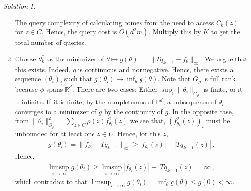 \documentclass{article}
\newcommand{\norm}[1]{\| #1 \|}
\newcommand{\R}{\mathbb{R}}
\DeclareMathOperator*{\1}{\mathbbm{1}}
\newcommand{\0}{\mathbf{0}}
\theoremstyle{definition}
\theoremstyle{remark}
\newtheorem*{solution*}{Solution}
\theoremstyle{theorem}
\newcommand{\cS}{\mathcal{S}}
\newcommand{\cA}{\mathcal{A}}
\begin{document}
\begin{solution*}
\begin{enumerate}
The query complexity of calculating comes from the need to access $C_k(z)$ for $z\in C$. Hence, the query cost is $O(d^2 m)$.
Multiply this by $K$ to get the total number of queries. 
\item Choose $\theta_k^*$ 
as the minimizer of $\theta \mapsto g(\theta):=\norm{ T q_{k-1} -  f_\theta }_\infty$. 
We argue that this exists. 
Indeed, $g$ is continuous and nonnegative. Hence, there exists a sequence $(\theta_i)_i$ such that $g(\theta_i)\to \inf_\theta g(\theta)$.
Note that $G_\rho$ is full rank because $\phi$ spans $\R^d$.
There are two cases: Either $\sup_i \norm{\theta_i}_{G_\rho}$ is finite, or it is infinite.
If it is finite, by the completeness of $\R^d$, a subsequence of $\theta_i$ converges to a minimizer of $g$
by the continuity of $g$.
In the opposite case, from $\norm{\theta_i}_{G_\rho}^2 = \sum_{z\in C} \rho(z) f_{\theta_i}^2(z)$ we see that, $(f_{\theta_i}^2(z))_i$ must be unbounded for at least one $z\in C$. 
Hence, for this $z$,
\begin{align*}
g(\theta_i)=\norm{f_{\theta_i} - T q_{k-1} }_\infty \ge |f_{\theta_i}(z)|-|T q_{k-1}(z)| \,.
\end{align*}
Hence,
\begin{align*}
\limsup_{i\to\infty} g(\theta_i) \ge \limsup_{i\to\infty} |f_{\theta_i}(z)|-|T q_{k-1}(z)|  = \infty\,,
\end{align*}
which contradict to that $\limsup_{i\to\infty} g(\theta_i) = \inf_{\theta} g(\theta) \le g(0) <\infty$.


\end{enumerate}
\end{solution*}
\end{document}

